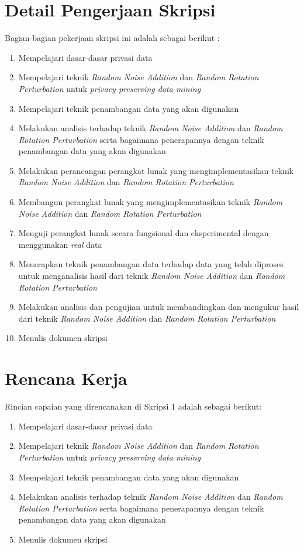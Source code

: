 \documentclass[a4paper,twoside]{article}
\begin{document}
\section{Detail Pengerjaan Skripsi}
Bagian-bagian pekerjaan skripsi ini adalah sebagai berikut :
	\begin{enumerate}
		\item Mempelajari dasar-dasar privasi data
		\item Mempelajari teknik \textit{Random Noise Addition} dan \textit{Random Rotation Perturbation} untuk \textit{privacy preserving data mining}
		\item Mempelajari teknik penambangan data yang akan digunakan
		\item Melakukan analisis terhadap teknik \textit{Random Noise Addition} dan \textit{Random Rotation Perturbation} serta bagaimana penerapannya dengan teknik penambangan data yang akan digunakan
		\item Melakukan perancangan perangkat lunak yang mengimplementasikan teknik \textit{Random Noise Addition} dan \textit{Random Rotation Perturbation}
		\item Membangun perangkat lunak yang mengimplementasikan teknik \textit{Random Noise Addition} dan \textit{Random Rotation Perturbation}
		\item Menguji perangkat lunak secara fungsional dan eksperimental dengan menggunakan \textit{real} data
		\item Menerapkan teknik penambangan data terhadap data yang telah diproses untuk menganalisis hasil dari teknik \textit{Random Noise Addition} dan \textit{Random Rotation Perturbation}
		\item Melakukan analisis dan pengujian untuk membandingkan dan mengukur hasil dari teknik \textit{Random Noise Addition} dan \textit{Random Rotation Perturbation}
		\item Menulis dokumen skripsi
	\end{enumerate}

\section{Rencana Kerja}
Rincian capaian yang direncanakan di Skripsi 1 adalah sebagai berikut:
\begin{enumerate}
	\item Mempelajari dasar-dasar privasi data
	\item Mempelajari teknik \textit{Random Noise Addition} dan \textit{Random Rotation Perturbation} untuk \textit{privacy preserving data mining}
	\item Mempelajari teknik penambangan data yang akan digunakan
	\item Melakukan analisis terhadap teknik \textit{Random Noise Addition} dan \textit{Random Rotation Perturbation} serta bagaimana penerapannya dengan teknik penambangan data yang akan digunakan
	\item Menulis dokumen skripsi
\end{enumerate}
\end{document}
